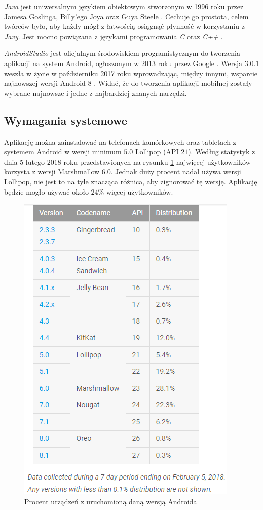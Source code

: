 \documentclass[twoside]{projektInzynierskiMS}
\begin{document}
\textit{Java} jest uniwersalnym językiem obiektowym stworzonym w 1996 roku przez Jamesa Goslinga, Billy'ego Joya oraz Guya Steele \cite{javaOracle}. Cechuje go prostota, celem twórców było, aby każdy mógł z łatwością osiągnąć płynność w korzystaniu z \textit{Javy}. Jest mocno powiązana z językami programowania \textit{C} oraz \textit{C++} \cite{javaOracle}. 

\textit{AndroidStudio} jest oficjalnym środowiskiem programistycznym do tworzenia aplikacji na system Android, ogłoszonym w 2013 roku przez Google \cite{PPPAndroida}. Wersja $3.0.1$ weszła w życie w październiku 2017 roku wprowadzając, między innymi, wsparcie najnowszej wersji Android $8$ \cite{androidStudioDev}. Widać, że do tworzenia aplikacji mobilnej zostały wybrane najnowsze i jedne z najbardziej znanych narzędzi.
 
\subsection{Wymagania systemowe}

Aplikację można zainstalować na telefonach komórkowych oraz tabletach z systemem Android w wersji minimum $5.0$ Lollipop (API $21$). Według statystyk z dnia $5$ lutego $2018$ roku \cite{androidStatistics} przedstawionych na rysunku \ref{fig:androidStats} najwięcej użytkowników korzysta z wersji Marshmallow $6.0$. Jednak duży procent nadal używa wersji Lollipop, nie jest to na tyle znacząca różnica, aby zignorować tę wersję. Aplikację będzie mogło używać około $24\%$ więcej użytkowników.    

\begin{figure}[h]
  \centering
  \includegraphics[width=0.6\linewidth]{img/android/stats.png}
  \caption{Procent urządzeń z uruchomioną daną wersją Androida}
  \label{fig:androidStats}
\end{figure}
\end{document}
